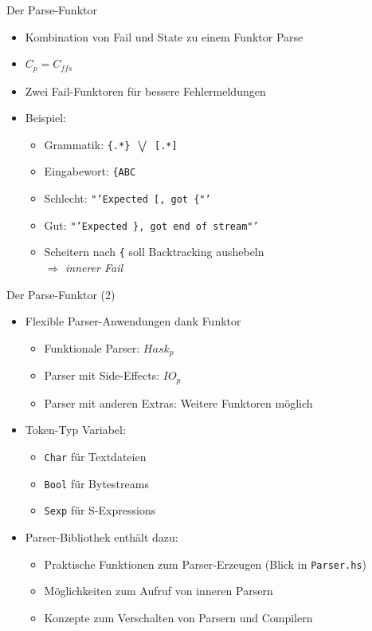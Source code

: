 \documentclass{beamer}
\begin{document}
\begin{frame}{Der Parse-Funktor}
  \begin{itemize}
  \item Kombination von Fail und State zu einem Funktor Parse
  \item $C_p = C_{ffs}$
  \item Zwei Fail-Funktoren für bessere Fehlermeldungen
  \item Beispiel:
    \begin{itemize}
    \item Grammatik: \texttt{\{.*\} $\bigvee$ [.*]}
    \item Eingabewort: \texttt{\{ABC}
    \item Schlecht: \texttt{"'Expected [, got \{"'}
    \item Gut: \texttt{"'Expected \}, got end of stream"'}
    \item Scheitern nach \texttt{\{} soll Backtracking aushebeln \\
      $\Rightarrow$ \textit{innerer Fail}
    \end{itemize}
  \end{itemize}
\end{frame}

\begin{frame}{Der Parse-Funktor (2)}
  \begin{itemize}
  \item Flexible Parser-Anwendungen dank Funktor
    \begin{itemize}
    \item Funktionale Parser: $Hask_p$
    \item Parser mit Side-Effects: $IO_p$
    \item Parser mit anderen Extras: Weitere Funktoren möglich
    \end{itemize}
  \item Token-Typ Variabel:
    \begin{itemize}
    \item \texttt{Char} für Textdateien
    \item \texttt{Bool} für Bytestreams
    \item \texttt{Sexp} für S-Expressions
    \end{itemize}
  \item Parser-Bibliothek enthält dazu:
    \begin{itemize}
    \item Praktische Funktionen zum Parser-Erzeugen (Blick in \texttt{Parser.hs})
    \item Möglichkeiten zum Aufruf von inneren Parsern
    \item Konzepte zum Verschalten von Parsern und Compilern
    \end{itemize}
  \end{itemize}
\end{frame}
\end{document}
